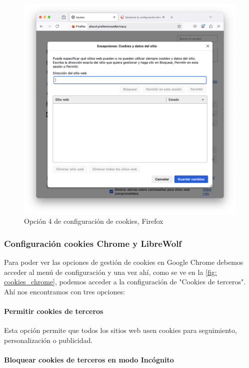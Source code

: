 \begin{figure}[H]   
    \includegraphics[width=15cm]{opcion4_ej14.png}
    \caption{Opción 4 de configuración de cookies, Firefox}
    \label{fig:opcion4_ej14}
\end{figure}


\subsubsection{Configuración cookies Chrome y LibreWolf}

Para poder ver las opciones de gestión de cookies en Google Chrome debemos acceder al menú de configuración y una vez ahí, como se ve en la \ref{fig: cookies_chrome}, podemos acceder a la configuración de "Cookies de terceros". Ahí nos encontramos con tres opciones: 

\paragraph{Permitir cookies de terceros}

Esta opción permite que todos los sitios web usen cookies para seguimiento, personalización o publicidad. 

\paragraph{Bloquear cookies de terceros en modo Incógnito}

